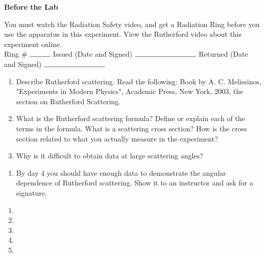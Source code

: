 \documentclass{../signatures}
\begin{document}
\maketitle

\names

\textbf{Before the Lab}

You must watch the Radiation Safety video, and get a Radiation Ring before you use the apparatus in this experiment. View the Rutherford video about this experiment online.
\\[24pt]

Ring \# $\rule{1cm}{0.15mm}$  Issued (Date and Signed) $\rule{3cm}{0.15mm}$  Returned (Date and Signed) $\rule{3cm}{0.15mm}$
\\[12pt]

\prelab

\begin{enumerate}

    \item Describe Rutherford scattering. Read the following: Book by A. C. Melissinos, "Experiments in Modern Physics", Academic Press, New York, 2003, the section on Rutherford Scattering.
    
    \item What is the Rutherford scattering formula? Define or explain each of the terms in the formula. What is a scattering cross section? How is the cross section related to what you actually measure in the experiment?

    \item Why is it difficult to obtain data at large scattering angles?
       \\[36pt]
\end{enumerate}

\prelabsignatures

\midlab

\begin{enumerate}

    \item By day 4 you should have enough data to demonstrate the angular dependence of Rutherford scattering. Show it to an instructor and ask for a signature.
\\[36pt]
\end{enumerate}


\checkpointsection 

\begin{enumerate}

\item {}

\item {}

\item {}

\item {}

\item {}

\end{enumerate}
\end{document}
